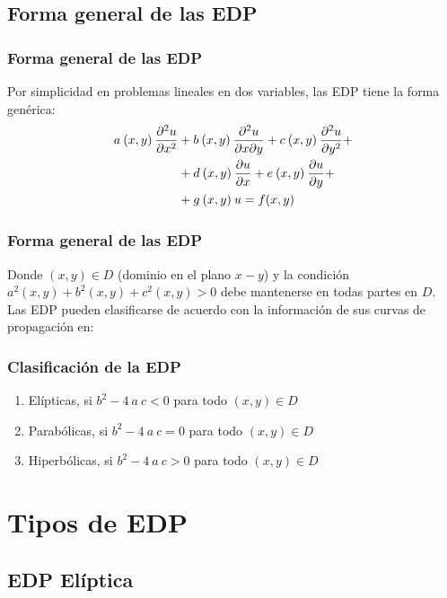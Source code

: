 \documentclass[12pt]{beamer}
\begin{document}
\subsection{Forma general de las EDP}

\begin{frame}
\frametitle{Forma general de las EDP}
Por simplicidad en problemas lineales en dos variables, las EDP tiene la forma genérica:
\begin{align*}
a \: (x,y) \: \pdv[2]{u}{x} &+ b \: (x,y) \: \pdv[2]{u}{x}{y} + c \: (x,y) \: \pdv[2]{u}{y} + \\
&+ d \: (x,y) \: \pdv{u}{x} + e \: (x,y) \: \pdv{u}{y} + \\
&+ g \: (x,y) \: u = f (x,y)
\end{align*}
\end{frame}
\begin{frame}
\frametitle{Forma general de las EDP}
Donde $(x, y) \in D$ (dominio en el plano $x-y$) y la condición $a^{2} (x, y) + b^{2} (x, y) + c^{2} (x, y) > 0$ debe mantenerse en todas partes en $D$.
\\
\bigskip
\pause
Las EDP pueden clasificarse de acuerdo con la información de sus curvas de propagación en:
\end{frame}
\begin{frame}
\frametitle{Clasificación de la EDP}
\begin{enumerate}[<+->]
\item Elípticas, si $b^{2} - 4 \: a\: c < 0$ para todo $(x,y) \in D$
\item Parabólicas, si $b^{2} - 4 \: a \: c = 0$ para todo $(x,y) \in D$
\item Hiperbólicas, si $b^{2} - 4 \: a \: c > 0$ para todo $(x,y) \in D$
\end{enumerate}
\end{frame}

\section{Tipos de EDP}
\subsection{EDP Elíptica}
\end{document}
